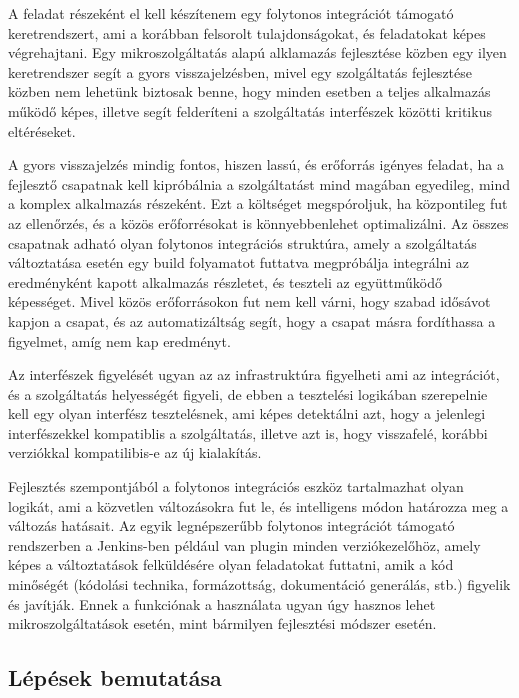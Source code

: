 \documentclass[11pt,magyar,a4paper,twoside,]{report}
\begin{document}
A feladat részeként el kell készítenem egy folytonos integrációt
támogató keretrendszert, ami a korábban felsorolt tulajdonságokat, és
feladatokat képes végrehajtani. Egy mikroszolgáltatás alapú alklamazás
fejlesztése közben egy ilyen keretrendszer segít a gyors
visszajelzésben, mivel egy szolgáltatás fejlesztése közben nem lehetünk
biztosak benne, hogy minden esetben a teljes alkalmazás működő képes,
illetve segít felderíteni a szolgáltatás interfészek közötti kritikus
eltéréseket.

A gyors visszajelzés mindig fontos, hiszen lassú, és erőforrás igényes
feladat, ha a fejlesztő csapatnak kell kipróbálnia a szolgáltatást mind
magában egyedileg, mind a komplex alkalmazás részeként. Ezt a költséget
megspóroljuk, ha központileg fut az ellenőrzés, és a közös erőforrésokat
is könnyebbenlehet optimalizálni. Az összes csapatnak adható olyan
folytonos integrációs struktúra, amely a szolgáltatás változtatása
esetén egy build folyamatot futtatva megpróbálja integrálni az
eredményként kapott alkalmazás részletet, és teszteli az együttműködő
képességet. Mivel közös erőforrásokon fut nem kell várni, hogy szabad
idősávot kapjon a csapat, és az automatizáltság segít, hogy a csapat
másra fordíthassa a figyelmet, amíg nem kap eredményt.

Az interfészek figyelését ugyan az az infrastruktúra figyelheti ami az
integrációt, és a szolgáltatás helyességét figyeli, de ebben a
tesztelési logikában szerepelnie kell egy olyan interfész tesztelésnek,
ami képes detektálni azt, hogy a jelenlegi interfészekkel kompatiblis a
szolgáltatás, illetve azt is, hogy visszafelé, korábbi verziókkal
kompatilibis-e az új kialakítás.

Fejlesztés szempontjából a folytonos integrációs eszköz tartalmazhat
olyan logikát, ami a közvetlen változásokra fut le, és intelligens módon
határozza meg a változás hatásait. Az egyik legnépszerűbb folytonos
integrációt támogató rendszerben a Jenkins-ben például van plugin minden
verziókezelőhöz, amely képes a változtatások felküldésére olyan
feladatokat futtatni, amik a kód minőségét (kódolási technika,
formázottság, dokumentáció generálás, stb.) figyelik és javítják. Ennek
a funkciónak a használata ugyan úgy hasznos lehet mikroszolgáltatások
esetén, mint bármilyen fejlesztési módszer esetén.

\subsection{Lépések bemutatása}\label{luxe9puxe9sek-bemutatuxe1sa}
\end{document}
